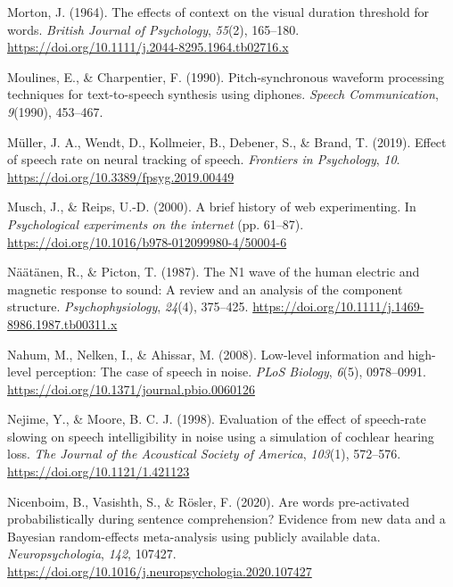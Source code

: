 \documentclass[a4paper, nobind]{templates/ociamthesis}
\newlength{\cslhangindent}
\newenvironment{CSLReferences}[2] %
 {%
  \setlength{\parindent}{0pt}
  \ifodd #1
  \let\oldpar\par
  \def\par{\hangindent=\cslhangindent\oldpar}
  \fi
  \setlength{\parskip}{1mm}
  \setlength{\baselineskip}{6mm}
 }%
 {}
\begin{document}
\begin{CSLReferences}{1}{0}
\leavevmode{}%
Morton, J. (1964). {The effects of context on the visual duration threshold for words}. \emph{British Journal of Psychology}, \emph{55}(2), 165--180. \url{https://doi.org/10.1111/j.2044-8295.1964.tb02716.x}

\leavevmode{}%
Moulines, E., \& Charpentier, F. (1990). {Pitch-synchronous waveform processing techniques for text-to-speech synthesis using diphones}. \emph{Speech Communication}, \emph{9}(1990), 453--467.

\leavevmode{}%
Müller, J. A., Wendt, D., Kollmeier, B., Debener, S., \& Brand, T. (2019). {Effect of speech rate on neural tracking of speech}. \emph{Frontiers in Psychology}, \emph{10}. \url{https://doi.org/10.3389/fpsyg.2019.00449}

\leavevmode{}%
Musch, J., \& Reips, U.-D. (2000). {A brief history of web experimenting}. In \emph{Psychological experiments on the internet} (pp. 61--87). \url{https://doi.org/10.1016/b978-012099980-4/50004-6}

\leavevmode{}%
Näätänen, R., \& Picton, T. (1987). {The N1 wave of the human electric and magnetic response to sound: A review and an analysis of the component structure}. \emph{Psychophysiology}, \emph{24}(4), 375--425. \url{https://doi.org/10.1111/j.1469-8986.1987.tb00311.x}

\leavevmode{}%
Nahum, M., Nelken, I., \& Ahissar, M. (2008). {Low-level information and high-level perception: The case of speech in noise}. \emph{PLoS Biology}, \emph{6}(5), 0978--0991. \url{https://doi.org/10.1371/journal.pbio.0060126}

\leavevmode{}%
Nejime, Y., \& Moore, B. C. J. (1998). {Evaluation of the effect of speech-rate slowing on speech intelligibility in noise using a simulation of cochlear hearing loss}. \emph{The Journal of the Acoustical Society of America}, \emph{103}(1), 572--576. \url{https://doi.org/10.1121/1.421123}

\leavevmode{}%
Nicenboim, B., Vasishth, S., \& Rösler, F. (2020). Are words pre-activated probabilistically during sentence comprehension? Evidence from new data and a Bayesian random-effects meta-analysis using publicly available data. \emph{Neuropsychologia}, \emph{142}, 107427. \url{https://doi.org/10.1016/j.neuropsychologia.2020.107427}


\end{CSLReferences}
\end{document}
